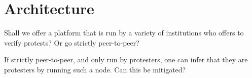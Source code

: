 \mode*
\section{Architecture}

\begin{frame}
  \begin{question}
    Shall we offer a platform that is run by a variety of institutions who 
    offers to verify protests?
    Or go strictly peer-to-peer?
  \end{question}
  \begin{question}
    If strictly peer-to-peer, and only run by protesters, one can infer that 
    they are protesters by running such a node.
    Can this be mitigated?
  \end{question}
\end{frame}
